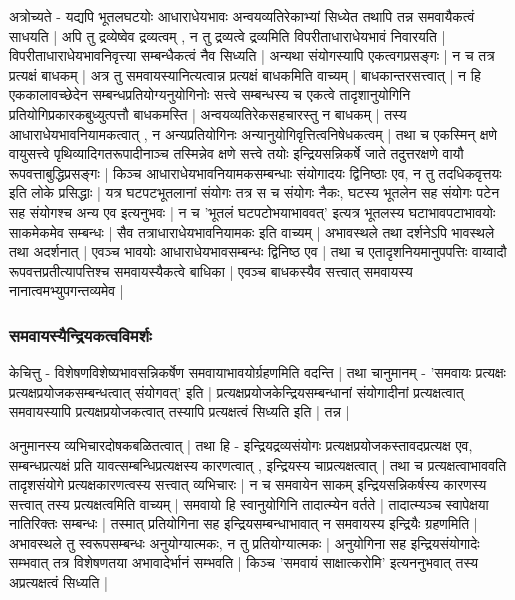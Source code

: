 अत्रोच्यते - यद्यपि भूतलघटयोः आधाराधेयभावः अन्वयव्यतिरेकाभ्यां सिध्येत तथापि तन्न समवायैकत्वं साधयति | अपि तु द्रव्येष्वेव द्रव्यत्वम् , न तु द्रव्यत्वे द्रव्यमिति विपरीताधाराधेयभावं निवारयति | विपरीताधाराधेयभावनिवृत्त्या सम्बन्धैकत्वं नैव सिध्यति | अन्यथा संयोगस्यापि एकत्वगप्रसङ्गः | न च तत्र प्रत्यक्षं बाधकम् | अत्र तु समवायस्यानित्यत्वान्न प्रत्यक्षं बाधकमिति वाच्यम् | बाधकान्तरसत्त्वात् | न हि एककालावच्छेदेन सम्बन्धप्रतियोग्यनुयोगिनोः सत्त्वे सम्बन्धस्य च एकत्वे तादृशानुयोगिनि प्रतियोगिप्रकारकबुध्युत्पत्तौ बाधकमस्ति | अन्वयव्यतिरेकसहचारस्तु न बाधकम् | तस्य आधाराधेयभावनियामकत्वात् , न अन्यप्रतियोगिनः अन्यानुयोगिवृत्तित्वनिषेधकत्वम् | तथा च एकस्मिन् क्षणे वायुसत्त्वे पृथिव्यादिगतरूपादीनाञ्च तस्मिन्नेव क्षणे सत्त्वे तयोः इन्द्रियसन्निकर्षे जाते तदुत्तरक्षणे वायौ रूपवत्ताबुद्धिप्रसङ्गः | किञ्च आधाराधेयभावनियामकसम्बन्धाः संयोगादयः द्विनिष्ठाः एव, न तु तदधिकवृत्तयः इति लोके प्रसिद्धाः | यत्र घटपटभूतलानां संयोगः तत्र स च संयोगः नैकः, घटस्य भूतलेन सह संयोगः पटेन सह संयोगश्च अन्य एव इत्यनुभवः | न च 'भूतलं घटपटोभयाभाववत्' इत्यत्र भूतलस्य घटाभावपटाभावयोः साकमेकमेव सम्बन्धः | सैव तत्राधाराधेयभावनियामकः इति वाच्यम् | अभावस्थले तथा दर्शनेऽपि भावस्थले तथा अदर्शनात् | एवञ्च भावयोः आधाराधेयभावसम्बन्धः द्विनिष्ठ एव | तथा च एतादृशनियमानुपपत्तिः वाय्वादौ रूपवत्तप्रतीत्यापत्तिश्च समवायस्यैकत्वे बाधिका | एवञ्च बाधकस्यैव सत्त्वात् समवायस्य नानात्वमभ्युपगन्तव्यमेव |

\subsubsection{समवायस्यैन्द्रियकत्वविमर्शः}

केचित्तु - विशेषणविशेष्यभावसन्निकर्षेण समवायाभावयोर्ग्रहणमिति वदन्ति | तथा चानुमानम् - 'समवायः प्रत्यक्षः प्रत्यक्षप्रयोजकसम्बन्धत्वात् संयोगवत्' इति | प्रत्यक्षप्रयोजकेन्द्रियसम्बन्धानां संयोगादीनां प्रत्यक्षत्वात् समवायस्यापि प्रत्यक्षप्रयोजकत्वात् तस्यापि प्रत्यक्षत्वं सिध्यति इति | तन्न | 

अनुमानस्य व्यभिचारदोषकबळितत्वात् | तथा हि - इन्द्रियद्रव्यसंयोगः प्रत्यक्षप्रयोजकस्तावदप्रत्यक्ष एव, सम्बन्धप्रत्यक्षं प्रति यावत्सम्बन्धिप्रत्यक्षस्य कारणत्वात् , इन्द्रियस्य चाप्रत्यक्षत्वात् | तथा च प्रत्यक्षत्वाभाववति तादृशसंयोगे प्रत्यक्षकारणत्वस्य सत्त्वात् व्यभिचारः | न च समवायेन साकम् इन्द्रियसन्निकर्षस्य कारणस्य सत्त्वात् तस्य प्रत्यक्षत्वमिति वाच्यम् | समवायो हि स्वानुयोगिनि तादात्म्येन वर्तते | तादात्म्यञ्च स्वापेक्षया नातिरिक्तः सम्बन्धः | तस्मात् प्रतियोगिना सह इन्द्रियसम्बन्धाभावात् न समवायस्य इन्द्रियैः ग्रहणमिति | अभावस्थले तु  स्वरूपसम्बन्धः अनुयोग्यात्मकः, न तु प्रतियोग्यात्मकः | अनुयोगिना सह इन्द्रियसंयोगादेः सम्भवात् तत्र विशेषणतया अभावादेर्भानं सम्भवति | किञ्च 'समवायं साक्षात्करोमि' इत्यननुभवात् तस्य अप्रत्यक्षत्वं सिध्यति |

